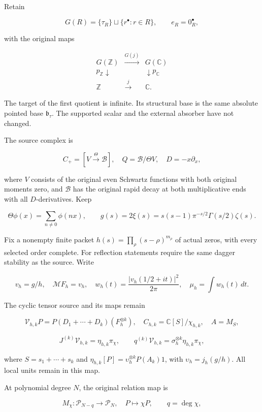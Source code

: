 \documentclass[
  11pt,
]{article}
\begin{document}
Retain

\[
G(R)=\{\tau_R\}\sqcup\{r^\bullet:r\in R\},\qquad e_R=0_R^\bullet,
\]

with the original maps

\[
\begin{array}{ccc}
G(\mathbb Z)&\xrightarrow{G(j)}&G(\mathbb C)\\
p_{\mathbb Z}\downarrow&&\downarrow p_{\mathbb C}\\
\mathbb Z&\xrightarrow{j}&\mathbb C.
\end{array}                                                    \tag{1}
\]

The target of the first quotient is infinite. Its structural base is the
same absolute pointed base \(\mathfrak b_\tau\). The supported scalar
and the external absorber have not changed.

The source complex is

\[
C_+=[V\xrightarrow{\Theta}\mathscr B],\quad
Q=\mathscr B/\Theta V,\quad D=-x\partial_x,
\]

where \(V\) consists of the original even Schwartz functions with both
original moments zero, and \(\mathscr B\) has the original rapid decay
at both multiplicative ends with all \(D\)-derivatives. Keep

\[
\Theta\phi(x)=\sum_{n\ne0}\phi(nx),\qquad
 g(s)=2\xi(s)=s(s-1)\pi^{-s/2}\Gamma(s/2)\zeta(s).
\]

Fix a nonempty finite packet \(h(s)=\prod_\rho(s-\rho)^{m_\rho}\) of
actual zeros, with every selected order complete. For reflection
statements require the same dagger stability as the source. Write

\[
v_h=g/h,\quad \mathcal MF_h=v_h,\quad
w_h(t)=\frac{|v_h(1/2+it)|^2}{2\pi},\quad \mu_h=\int w_h(t)\,dt.       \tag{2}
\]

The cyclic tensor source and its maps remain

\[
\mathcal V_{h,k}P=P(D_1+\cdots+D_k)(F_h^{\otimes k}),\quad
C_{h,k}=\mathbb C[S]/\chi_{h,k},\quad A=M_S,
\]

\[
J^{(k)}\mathcal V_{h,k}=\eta_{h,k}\pi_\chi,\qquad
q^{(k)}\mathcal V_{h,k}=\sigma_h^{\otimes k}\eta_{h,k}\pi_\chi,          \tag{3}
\]

where \(S=s_1+\cdots+s_k\) and
\(\eta_{h,k}[P]=\upsilon_h^{\otimes k}P(A_k)1\), with
\(\upsilon_h=j_h(g/h)\). All local units remain in this map.

At polynomial degree \(N\), the original relation map is

\[
M_\chi:\mathcal P_{N-q}\longrightarrow\mathcal P_N,\quad P\mapsto\chi P,
\qquad q=\deg\chi,                                                   \tag{4}
\]
\end{document}
